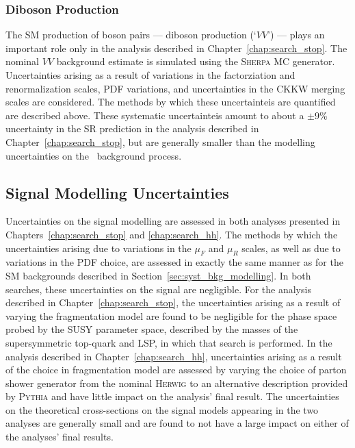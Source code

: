 \subsubsection{Diboson Production}

The SM production of boson pairs --- diboson production (`$VV$') --- plays an important role only in the
analysis described in Chapter~\ref{chap:search_stop}.
The nominal $VV$ background estimate is simulated using the \textsc{Sherpa} MC generator.
Uncertainties arising as a result of variations in the factorziation and renormalization scales,
PDF variations, and uncertainties in the CKKW merging scales are considered.
The methods by which these uncertainteis are quantified are described above.
These systematic uncertainteis amount to about a $\pm 9$\% uncertainty in the SR prediction
in the analysis described in Chapter~\ref{chap:search_stop}, but are generally smaller than
the modelling uncertainties on the \ttbar~background process.

%
%

\subsection{Signal Modelling Uncertainties}
\label{sec:syst_sig_modelling}

Uncertainties on the signal modelling are assessed in both analyses presented in Chapters~\ref{chap:search_stop}
and \ref{chap:search_hh}.
The methods by which the uncertainties arising due to variations in the $\mu_F$ and $\mu_R$ scales, as
well as due to variations in the PDF choice, are assessed in exactly the same manner
as for the SM backgrounds described in Section~\ref{sec:syst_bkg_modelling}.
In both searches, these uncertainties on the signal are negligible.
For the analysis described in Chapter~\ref{chap:search_stop}, the uncertainties
arising as a result of varying the fragmentation model are found to be negligible for the
phase space probed by the SUSY parameter space, described by the masses of the supersymmetric
top-quark and LSP, in which that search is performed.
In the analysis described in Chapter~\ref{chap:search_hh}, uncertainties arising as a result of
the choice in fragmentation model are assessed by varying the choice of parton shower generator
from the nominal \textsc{Herwig} to an alternative description provided by \textsc{Pythia}
and have little impact on the analysis' final result.
The uncertainties on the theoretical cross-sections on the signal models appearing in the two analyses
are generally small and are found to not have a large impact on either of the analyses' final results.

